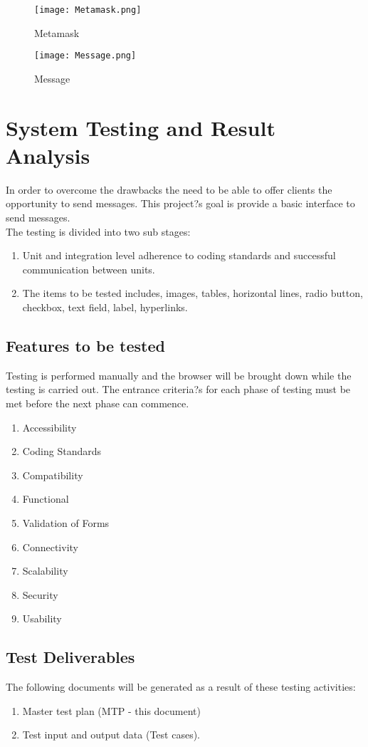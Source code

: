 \documentclass[12pt,a4paper]{article}
\begin{document}
\begin{figure}[H]
\centering
\texttt{[image: Metamask.png]}
\caption{Metamask}
\end{figure}

\begin{figure}[H]
\centering
\texttt{[image: Message.png]}
\caption{Message}
\end{figure}

\newpage
\section{System Testing and Result Analysis}
In order to overcome the drawbacks the need to be able to offer clients the opportunity to send messages. This project?s goal is provide a basic interface to send messages.\\

The testing is divided into two sub stages:
\begin{enumerate}
\item Unit and integration level adherence to coding standards and successful communication between units.
\item The items to be tested includes, images, tables, horizontal lines, radio button, checkbox, text field, label, hyperlinks.
\end{enumerate}

\subsection{Features to be tested}
Testing is performed manually and the browser will be brought down while
the testing is carried out.
The entrance criteria?s for each phase of testing must be met before the next phase can commence.
\begin{enumerate}
\item Accessibility
\item Coding Standards
\item Compatibility
\item Functional
\item Validation of Forms
\item Connectivity
\item Scalability
\item Security
\item Usability
\end{enumerate}

\subsection{Test Deliverables}
The following documents will be generated as a result of these testing activities:
\begin{enumerate}
\item Master test plan (MTP - this document)
\item Test input and output data (Test cases).
\end{enumerate}
\end{document}
